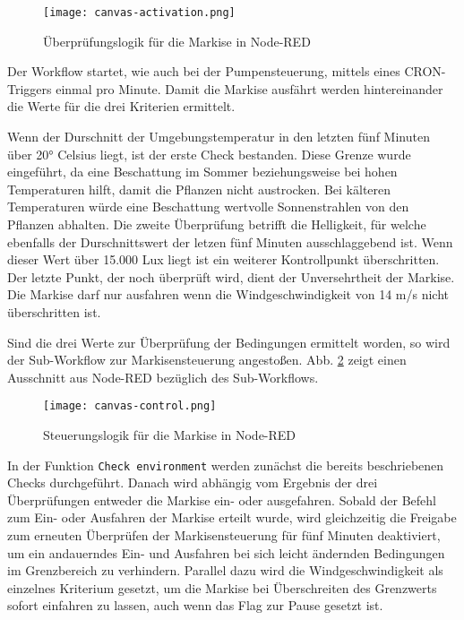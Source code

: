 \begin{figure}[h]
  \centering
  \texttt{[image: canvas-activation.png]}
  \caption{Überprüfungslogik für die Markise in Node-RED}\label{fig:canvas-activation}
\end{figure}

Der Workflow startet, wie auch bei der Pumpensteuerung, mittels eines CRON-Triggers einmal pro Minute. Damit die Markise ausfährt werden hintereinander die Werte für die drei Kriterien ermittelt. 

Wenn der Durschnitt der Umgebungstemperatur in den letzten fünf Minuten über 20° Celsius liegt, ist der erste Check bestanden. Diese Grenze wurde eingeführt, da eine Beschattung im Sommer beziehungsweise bei hohen Temperaturen hilft, damit die Pflanzen nicht austrocken. Bei kälteren Temperaturen würde eine Beschattung wertvolle Sonnenstrahlen von den Pflanzen abhalten. Die zweite Überprüfung betrifft die Helligkeit, für welche ebenfalls der Durschnittswert der letzen fünf Minuten ausschlaggebend ist. Wenn dieser Wert über 15.000 Lux liegt ist ein weiterer Kontrollpunkt überschritten. Der letzte Punkt, der noch überprüft wird, dient der Unversehrtheit der Markise. Die Markise darf nur ausfahren wenn die Windgeschwindigkeit von 14 m/s nicht überschritten ist.

Sind die drei Werte zur Überprüfung der Bedingungen ermittelt worden, so wird der Sub-Workflow zur Markisensteuerung angestoßen. Abb. \ref{fig:canvas-control} zeigt einen Ausschnitt aus Node-RED bezüglich des Sub-Workflows.

\begin{figure}[h]
  \centering
  \texttt{[image: canvas-control.png]}
  \caption{Steuerungslogik für die Markise in Node-RED}\label{fig:canvas-control}
\end{figure}

In der Funktion \texttt{Check environment} werden zunächst die bereits beschriebenen Checks durchgeführt. Danach wird abhängig vom Ergebnis der drei Überprüfungen entweder die Markise ein- oder ausgefahren.
Sobald der Befehl zum Ein- oder Ausfahren der Markise erteilt wurde, wird gleichzeitig die Freigabe zum erneuten Überprüfen der Markisensteuerung für fünf Minuten deaktiviert, um ein andauerndes Ein- und Ausfahren bei sich leicht ändernden Bedingungen im Grenzbereich zu verhindern. Parallel dazu wird die Windgeschwindigkeit als einzelnes Kriterium gesetzt, um die Markise bei Überschreiten des Grenzwerts sofort einfahren zu lassen, auch wenn das Flag zur Pause gesetzt ist.

